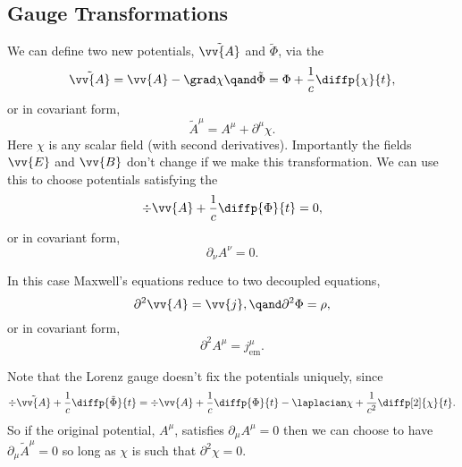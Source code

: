 \documentclass[fleqn]{NotesClass}
\newcommand{\dalembertian}{\partial^2}
\newcommand{\EM}{\text{em}}
\begin{document}
\begin{appendices}
        \subsection{Gauge Transformations}
        We can define two new potentials, \(\tilde{\vv{A}}\) and \(\tilde{\Phi}\), via the 
        \begin{equation}
            \tilde{\vv{A}} = \vv{A} - \grad\chi \qand \tilde{\Phi} = \Phi + \frac{1}{c}\diffp{\chi}{t},
        \end{equation}
        or in covariant form,
        \begin{equation}
            \tilde{A}^\mu = A^\mu + \partial^\mu \chi.
        \end{equation}
        Here \(\chi\) is any scalar field (with second derivatives).
        Importantly the fields \(\vv{E}\) and \(\vv{B}\) don't change if we make this transformation.
        We can use this to choose potentials satisfying the 
        \begin{equation}
            \div \vv{A} + \frac{1}{c}\diffp{\Phi}{t} = 0,
        \end{equation}
        or in covariant form,
        \begin{equation}
            \partial_\nu A^\nu = 0.
        \end{equation}
        
        In this case Maxwell's equations reduce to two decoupled equations,
        \begin{equation}
            \dalembertian \vv{A} = \vv{j}, \qand \dalembertian\Phi = \rho,
        \end{equation}
        or in covariant form,
        \begin{equation}
            \dalembertian A^\mu = j_{\EM}^{\mu}.
        \end{equation}
        
        Note that the Lorenz gauge doesn't fix the potentials uniquely, since
        \begin{equation}
            \div\tilde{\vv{A}} + \frac{1}{c}\diffp{\tilde{\Phi}}{t} = \div\vv{A} + \frac{1}{c}\diffp{\Phi}{t} - \laplacian \chi + \frac{1}{c^2} \diffp[2]{\chi}{t}.
        \end{equation}
        So if the original potential, \(A^\mu\), satisfies \(\partial_\mu A^\mu = 0\) then we can choose to have \(\partial_\mu \tilde{A}^\mu = 0\) so long as \(\chi\) is such that \(\dalembertian\chi = 0\).
        

\end{appendices}
\end{document}
